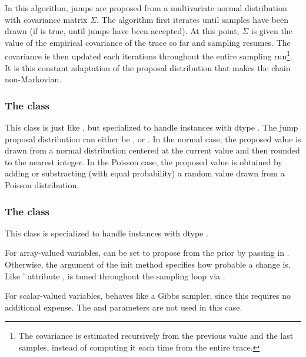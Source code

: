 In this algorithm, jumps are proposed from a multivariate normal
distribution with covariance matrix $\Sigma$. The algorithm first iterates
until  samples have been drawn (if  is true, until
 jumps have been accepted). At this point, $\Sigma$ is given
the value of the empirical covariance of the trace so far and sampling
resumes. The covariance is then updated each 
iterations throughout the entire sampling run\footnote{The covariance is
estimated recursively from the previous value and the last 
samples, instead of computing it each time from the entire trace.}. It is
this constant adaptation of the proposal distribution that makes the chain
non-Markovian.

\subsubsection[The DiscreteMetropolis class]{The
 class}
This class is just like , but specialized to handle
 instances with dtype . The jump proposal
distribution can either be ,  or .
In the normal case, the proposed value is drawn from a normal distribution
centered at the current value and then rounded to the
nearest integer. In the Poisson case, the proposed value is obtained by adding
or substracting (with equal probability) a random value drawn from a Poisson
distribution.

\subsubsection[The BinaryMetropolis class]{The
 class}
This class is specialized to handle  instances with dtype
.

For array-valued variables,  can be set to propose from
the prior by passing in . Otherwise, the argument
 of the init method specifies how probable a change is. Like
' attribute ,  is tuned
throughout the sampling loop via .

For scalar-valued variables,  behaves like a Gibbs
sampler, since this requires no additional expense. The  and
 parameters are not used in this case.

